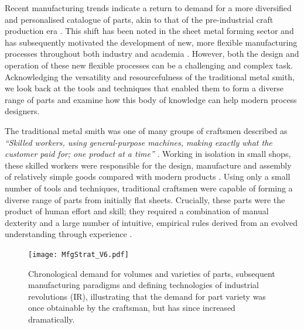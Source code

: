 Recent manufacturing trends indicate a return to demand for a more diversified and personalised catalogue of parts, akin to that of the pre-industrial craft production era \citep{Koren2010TheRevolution}. This shift has been noted in the sheet metal forming sector \citep{Lee2012CaseTechnique,Trzepiecinski2020RecentForming} and has subsequently motivated the development of new, more flexible manufacturing processes throughout both industry and academia \citep{Allwood2006AJapan,Yang2018FlexibilityForming}. However, both the design and operation of these new flexible processes can be a challenging and complex task. Acknowledging the versatility and resourcefulness of the traditional metal smith, we look back at the tools and techniques that enabled them to form a diverse range of parts and examine how this body of knowledge can help modern process designers.   

The traditional metal smith was one of many groups of craftsmen described as \textit{``Skilled workers, using general-purpose machines, making exactly what the customer paid for; one product at a time''} \citep{Koren2010TheRevolution}. Working in isolation in small shops, these skilled workers were responsible for the design, manufacture and assembly of relatively simple goods compared with modern products \citep{Groover2015AutomationEdition}.  Using only a small number of tools and techniques, traditional craftsmen were capable of forming a diverse range of parts from initially flat sheets. Crucially, these parts were the product of human effort and skill; they required a combination of manual dexterity and a large number of intuitive, empirical rules derived from an evolved understanding through experience \citep{Hall1961EngineeringRevolution}. 

\begin{figure}[h]
	\centering
	\texttt{[image: MfgStrat\_V6.pdf]}
	\caption{Chronological demand for volumes and varieties of parts, subsequent manufacturing paradigms and defining technologies of industrial revolutions (IR), illustrating that the demand for part variety was once obtainable by the craftsman, but has since increased dramatically.}
	\label{fig:VarietyVolume}
\end{figure}

